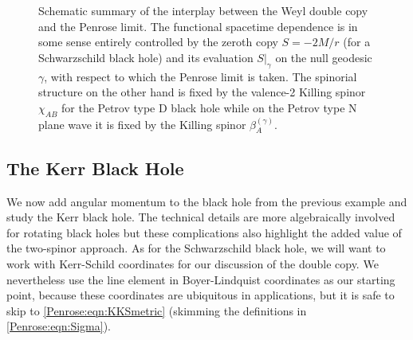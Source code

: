 \begin{figure}[h]
	\caption{Schematic summary of the interplay between the Weyl double copy and the Penrose limit. The
        functional spacetime dependence is in some sense entirely controlled by the zeroth copy $S =
    -2M / r$ (for a Schwarzschild black hole) and its evaluation $S|_{\gamma}$ on the null geodesic
$\gamma$, with respect to which the Penrose limit is taken. The spinorial structure on the other hand is fixed by
the valence-2 Killing spinor $\chi_{AB}$ for the Petrov type D black hole while on the Petrov
type N plane wave it is fixed by the Killing spinor $\beta_A^{(\gamma)}$.} \label{Penrose:fig:schematic}
\end{figure}

\subsection{The Kerr Black Hole}\label{Penrose:sec:Kerr}

We now add angular momentum to the black hole from the previous example and study the Kerr black hole. The
technical details are more algebraically involved for rotating black holes but these complications also highlight
the added value of the two-spinor approach. As for the Schwarzschild black hole, we will want to work with
Kerr-Schild coordinates for our discussion of the double copy. We nevertheless use the line element in
Boyer-Lindquist coordinates as our starting point, because these coordinates are ubiquitous in applications, but it is safe to skip to  \eqref{Penrose:eqn:KKSmetric} (skimming the definitions in \eqref{Penrose:eqn:Sigma}).

